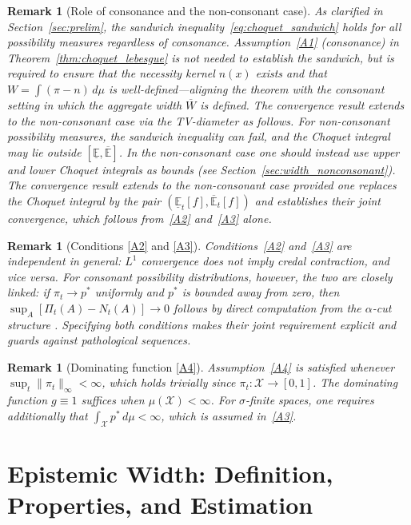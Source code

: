 \documentclass[12pt]{article}
\newtheorem{remark}[theorem]{Remark}
\newcommand{\calX}{\mathcal{X}}
\newcommand{\E}{\mathbb{E}}
\newcommand{\Lone}{L^1}
\begin{document}
\begin{remark}[Role of consonance and the non-consonant case]
\label{rem:non_consonant}
As clarified in Section~\ref{sec:prelim}, the sandwich
inequality~\eqref{eq:choquet_sandwich} holds for all possibility measures
regardless of consonance.
Assumption~\eqref{A1} (consonance) in Theorem~\ref{thm:choquet_lebesgue}
is not needed to establish the sandwich, but is required to ensure that
the necessity kernel $n(x)$ exists and that $W=\int(\pi-n)\,d\mu$ is
well-defined---aligning the theorem with the consonant setting in which
the aggregate width $\overline{W}$ is defined.
The convergence result extends to the non-consonant case via the TV-diameter
as follows.
For non-consonant possibility measures, the sandwich inequality can fail,
and the Choquet integral may lie outside $[\underline{\E},\overline{\E}]$.
In the non-consonant case one should instead use upper and lower Choquet
integrals as bounds (see Section~\ref{sec:width_nonconsonant}).
The convergence result extends to the non-consonant case provided one replaces
the Choquet integral by the pair $(\underline{\E}_t[f], \overline{\E}_t[f])$
and establishes their joint convergence, which follows from~\eqref{A2}
and~\eqref{A3} alone.
\end{remark}

\begin{remark}[Conditions \eqref{A2} and \eqref{A3}]
Conditions~\eqref{A2} and~\eqref{A3} are independent in general:
$\Lone$ convergence does not imply credal contraction, and vice versa.
For consonant possibility distributions, however, the two are closely linked:
if $\pi_t\to p^*$ uniformly and $p^*$ is bounded away from zero, then
$\sup_A[\Pi_t(A)-N_t(A)]\to 0$ follows by direct computation from the
$\alpha$-cut structure \cite{dubois1988}.
Specifying both conditions makes their joint requirement explicit and
guards against pathological sequences.
\end{remark}

\begin{remark}[Dominating function \eqref{A4}]
Assumption~\eqref{A4} is satisfied whenever $\sup_t\|\pi_t\|_\infty<\infty$,
which holds trivially since $\pi_t:\calX\to[0,1]$.
The dominating function $g\equiv 1$ suffices when $\mu(\calX)<\infty$.
For $\sigma$-finite spaces, one requires additionally that
$\int_\calX p^*\,d\mu<\infty$, which is assumed in~\eqref{A3}.
\end{remark}

\section{Epistemic Width: Definition, Properties, and Estimation}
\label{sec:width}
\end{document}
